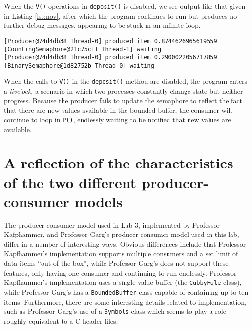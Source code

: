 \documentclass[12pt,a4paper]{article}
\begin{document}
		When the \texttt{V()} operations in \texttt{deposit()} is disabled, we see output like that given in Listing \ref{lst:nov}, after which the program continues to run but produces no further debug messages, appearing to be stuck in an infinite loop.

		\begin{lstlisting}[style=log, caption=Output from a defective program with the \texttt{V()} operation disabled.,label=lst:nov]
[Producer@74d4db38 Thread-0] produced item 0.8744626965619559
[CountingSemaphore@21c75cff Thread-1] waiting
[Producer@74d4db38 Thread-0] produced item 0.2900022056717859
[BinarySemaphore@1d82752b Thread-0] waiting
		\end{lstlisting}

		When the calls to \texttt{V()} in the \texttt{deposit()} method are disabled, the program enters a \textit{livelock}, a scenario in which two processes constantly change state but neither progress. Because the producer fails to update the semaphore to reflect the fact that there are new values available in the bounded buffer, the consumer will continue to loop in \texttt{P()}, endlessly waiting to be notified that new values are available.

	\section{A reflection of the characteristics of the two different producer-consumer models}

		The producer-consumer model used in Lab 3, implemented by Professor Kafphammer, and Professor Garg's producer-consumer model used in this lab, differ in a number of interesting ways. Obvious differences include that Professor Kapfhammer's implementation supports multiple consumers and a set limit of data items ``out of the box'', while Professor Garg's does not support these features, only having one consumer and continuing to run endlessly. Professor Kapfhammer's implementation uses a single-value buffer (the \texttt{CubbyHole} class), while Professor Garg's has a \texttt{BoundedBuffer} class capable of containing up to ten items. Furthermore, there are some interesting details related to implementation, such as Professor Garg's use of a \texttt{Symbols} class which seems to play a role roughly equivalent to a C header files. 
\end{document}
